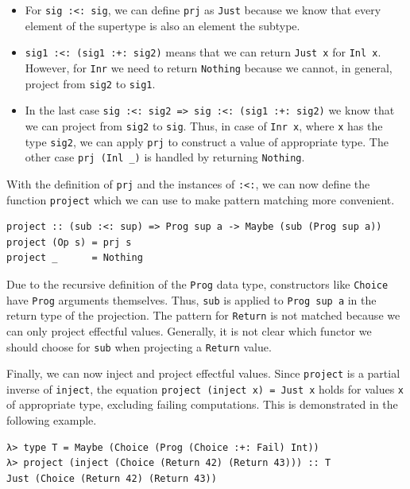 \documentclass[a4paper, 11pt, fleqn, twoside]{scrreprt}
\newcommand{\hinl}[1]{\texttt{#1}}
\newcommand{\cinl}[1]{\texttt{#1}}
\begin{document}
\begin{itemize}
\item For \hinl{sig :<: sig}, we can define \hinl{prj} as \hinl{Just} because we know that every element of the supertype is also an element the subtype.

\item \hinl{sig1 :<: (sig1 :+: sig2)} means that we can return \hinl{Just x} for \hinl{Inl x}.
However, for \hinl{Inr} we need to return \hinl{Nothing} because we cannot, in general, project from \hinl{sig2} to \hinl{sig1}.

\item In the last case \hinl{sig :<: sig2 => sig :<: (sig1 :+: sig2)} we know that we can project from \hinl{sig2} to \hinl{sig}.
Thus, in case of \hinl{Inr x}, where \hinl{x} has the type \hinl{sig2}, we can apply \hinl{prj} to construct a value of appropriate type.
The other case \hinl{prj (Inl _)} is handled by returning \hinl{Nothing}.
\end{itemize}

With the definition of \hinl{prj} and the instances of \hinl{:<:}, we can now define the function \hinl{project} which we can use to make pattern matching more convenient.

\begin{verbatim}
project :: (sub :<: sup) => Prog sup a -> Maybe (sub (Prog sup a))
project (Op s) = prj s
project _      = Nothing
\end{verbatim}

Due to the recursive definition of the \hinl{Prog} data type, constructors like \hinl{Choice} have \hinl{Prog} arguments themselves.
Thus, \hinl{sub} is applied to \hinl{Prog sup a} in the return type of the projection.
The pattern for \cinl{Return} is not matched because we can only project effectful values.
Generally, it is not clear which functor we should choose for \hinl{sub} when projecting a \hinl{Return} value.

Finally, we can now inject and project effectful values.
Since \hinl{project} is a partial inverse of \hinl{inject}, the equation \hinl{project (inject x) = Just x} holds for values \hinl{x} of appropriate type, excluding failing computations.
This is demonstrated in the following example.

\begin{verbatim}
λ> type T = Maybe (Choice (Prog (Choice :+: Fail) Int))
λ> project (inject (Choice (Return 42) (Return 43))) :: T
Just (Choice (Return 42) (Return 43))
\end{verbatim}
\end{document}
